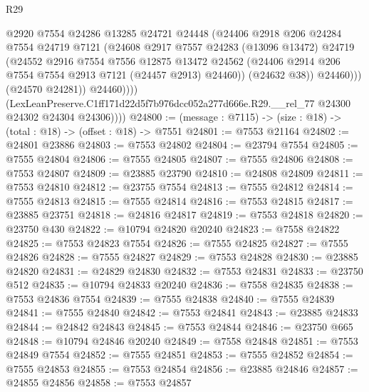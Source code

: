 \begin{lexlean}{R29}
\begin{coremodule}
                        @2920
                        @7554
                        @24286
                        @13285
                        @24721
                        @24448
                        (@24406
                          @2918
                          @206
                          @24284
                          @7554
                          @24719
                          @7121
                          (@24608
                            @2917
                            @7557
                            @24283
                            (@13096 @13472)
                            @24719
                            (@24552
                              @2916
                              @7554
                              @7556
                              @12875
                              @13472
                              @24562
                              (@24406 @2914 @206 @7554 @7554 @2913 @7121 (@24457 @2913) @24460))
                            (@24632 @38))
                          @24460)))
                    (@24570 @24281))
                  @24460))))
          (LexLeanPreserve.C1ff171d22d5f7b976dcc052a277d666e.R29.__rel_77
            @24300
            @24302
            @24304
            @24306))))
@24800 := (message : @7115) -> (size : @18) -> (total : @18) -> (offset : @18) -> @7551
@24801 := @7553 @21164
@24802 := @24801 @23886
@24803 := @7553 @24802
@24804 := @23794 @7554
@24805 := @7555 @24804
@24806 := @7555 @24805
@24807 := @7555 @24806
@24808 := @7553 @24807
@24809 := @23885 @23790
@24810 := @24808 @24809
@24811 := @7553 @24810
@24812 := @23755 @7554
@24813 := @7555 @24812
@24814 := @7555 @24813
@24815 := @7555 @24814
@24816 := @7553 @24815
@24817 := @23885 @23751
@24818 := @24816 @24817
@24819 := @7553 @24818
@24820 := @23750 @430
@24822 := @10794 @24820 @20240
@24823 := @7558 @24822
@24825 := @7553 @24823 @7554
@24826 := @7555 @24825
@24827 := @7555 @24826
@24828 := @7555 @24827
@24829 := @7553 @24828
@24830 := @23885 @24820
@24831 := @24829 @24830
@24832 := @7553 @24831
@24833 := @23750 @512
@24835 := @10794 @24833 @20240
@24836 := @7558 @24835
@24838 := @7553 @24836 @7554
@24839 := @7555 @24838
@24840 := @7555 @24839
@24841 := @7555 @24840
@24842 := @7553 @24841
@24843 := @23885 @24833
@24844 := @24842 @24843
@24845 := @7553 @24844
@24846 := @23750 @665
@24848 := @10794 @24846 @20240
@24849 := @7558 @24848
@24851 := @7553 @24849 @7554
@24852 := @7555 @24851
@24853 := @7555 @24852
@24854 := @7555 @24853
@24855 := @7553 @24854
@24856 := @23885 @24846
@24857 := @24855 @24856
@24858 := @7553 @24857

\end{coremodule}
\end{lexlean}
